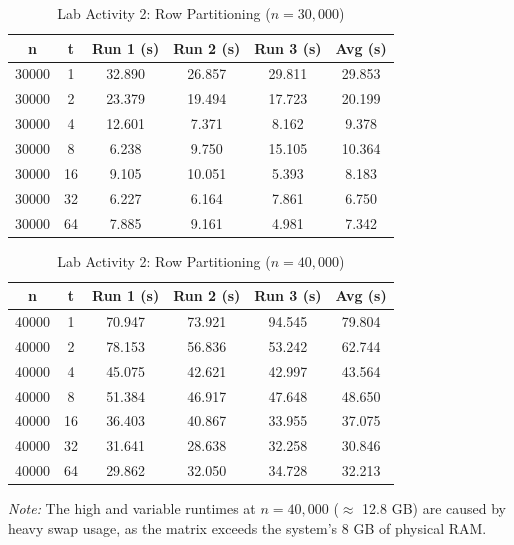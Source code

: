 \documentclass[journal]{IEEEtran}
\begin{document}
\begin{table}[H]
    \centering
    \caption{Lab Activity 2: Row Partitioning ($n = 30{,}000$)}
    \label{tab:act2_30k}
    \footnotesize
    \begin{tabular}{|c|c|c|c|c|c|}
        \hline
        \textbf{n} & \textbf{t} & \textbf{Run 1 (s)} & \textbf{Run 2 (s)} & \textbf{Run 3 (s)} & \textbf{Avg (s)} \\
        \hline
        30000 & 1  & 32.890 & 26.857 & 29.811 & 29.853 \\
        \hline
        30000 & 2  & 23.379 & 19.494 & 17.723 & 20.199 \\
        \hline
        30000 & 4  & 12.601 & 7.371  & 8.162  & 9.378  \\
        \hline
        30000 & 8  & 6.238  & 9.750  & 15.105 & 10.364 \\
        \hline
        30000 & 16 & 9.105  & 10.051 & 5.393  & 8.183  \\
        \hline
        30000 & 32 & 6.227  & 6.164  & 7.861  & 6.750  \\
        \hline
        30000 & 64 & 7.885  & 9.161  & 4.981  & 7.342  \\
        \hline
    \end{tabular}
\end{table}

\begin{table}[H]
    \centering
    \caption{Lab Activity 2: Row Partitioning ($n = 40{,}000$)}
    \label{tab:act2_40k}
    \footnotesize
    \begin{tabular}{|c|c|c|c|c|c|}
        \hline
        \textbf{n} & \textbf{t} & \textbf{Run 1 (s)} & \textbf{Run 2 (s)} & \textbf{Run 3 (s)} & \textbf{Avg (s)} \\
        \hline
        40000 & 1  & 70.947 & 73.921 & 94.545 & 79.804 \\
        \hline
        40000 & 2  & 78.153 & 56.836 & 53.242 & 62.744 \\
        \hline
        40000 & 4  & 45.075 & 42.621 & 42.997 & 43.564 \\
        \hline
        40000 & 8  & 51.384 & 46.917 & 47.648 & 48.650 \\
        \hline
        40000 & 16 & 36.403 & 40.867 & 33.955 & 37.075 \\
        \hline
        40000 & 32 & 31.641 & 28.638 & 32.258 & 30.846 \\
        \hline
        40000 & 64 & 29.862 & 32.050 & 34.728 & 32.213 \\
        \hline
    \end{tabular}
    \begin{flushleft}
    \footnotesize
    \textit{Note:} The high and variable runtimes at $n = 40{,}000$ ($\approx$ 12.8 GB) are caused by heavy swap usage, as the matrix exceeds the system's 8 GB of physical RAM.
    \end{flushleft}
\end{table}
\end{document}
